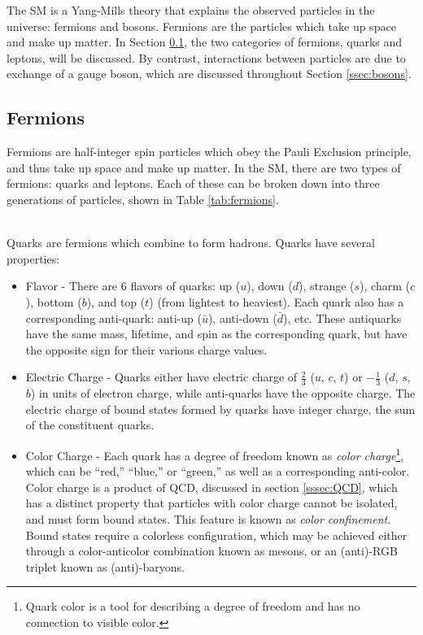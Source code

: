         The \gls{SM} is a Yang-Mills theory that explains the observed particles in the universe: fermions and bosons. Fermions are the particles which take up space and make up matter. In Section \ref{ssec:fermions}, the two categories of fermions, quarks and leptons, will be discussed. By contrast, interactions between particles are due to exchange of a gauge boson, which are discussed throughout Section \ref{ssec:bosons}.


        \subsection{Fermions} \label{ssec:fermions}
        Fermions are half-integer spin particles which obey the Pauli Exclusion principle, and thus take up space and make up matter. In the \gls{SM}, there are two types of fermions: quarks and leptons. Each of these can be broken down into three generations of particles, shown in Table \ref{tab:fermions}.

        \\
        \indent Quarks are fermions which combine to form hadrons. Quarks have several properties:
        \begin{itemize}
            \item Flavor - There are 6 flavors of quarks: up ($u$), down ($d$), strange ($s$), charm ($c$), bottom ($b$), and top ($t$) (from lightest to heaviest). Each quark also has a corresponding anti-quark: anti-up ($\bar{u}$), anti-down ($\bar{d}$), etc. These antiquarks have the same mass, lifetime, and spin as the corresponding quark, but have the opposite sign for their various charge values.
            \item Electric Charge - Quarks either have electric charge of $\frac{2}{3}$ ($u$, $c$, $t$) or $-\frac{1}{3}$ ($d$, $s$, $b$) in units of electron charge, while anti-quarks have the opposite charge. The electric charge of bound states formed by quarks have integer charge, the sum of the constituent quarks.
            \item Color Charge - Each quark has a degree of freedom known as \textit{color charge}\footnote{Quark color is a tool for describing a degree of freedom and has no connection to visible color.}, which can be ``red,'' ``blue,'' or ``green,'' as well as a corresponding anti-color. Color charge is a product of \gls{QCD}, discussed in section \ref{sssec:QCD}, which has a distinct property that particles with color charge cannot be isolated, and must form bound states. This feature is known as \textit{color confinement}. Bound states require a colorless configuration, which may be achieved either through a color-anticolor combination known as mesons, or an (anti)-RGB triplet known as (anti)-baryons. 
        \end{itemize}

